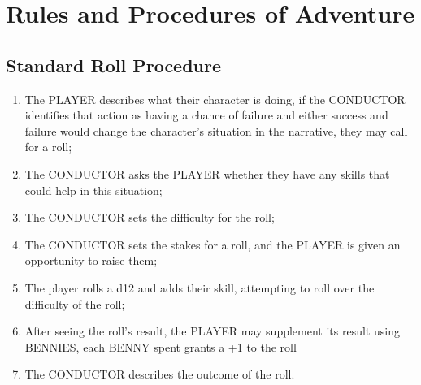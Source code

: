 \section{Rules and Procedures of Adventure}

\subsection{Standard Roll Procedure}
\begin{enumerate}
    \item {The PLAYER describes what their character is doing, if the CONDUCTOR identifies that action as having a chance of failure and either success and failure would change the character's situation in the narrative, they may call for a roll;}
    \item {The CONDUCTOR asks the PLAYER whether they have any skills that could help in this situation;}
    \item {The CONDUCTOR sets the difficulty for the roll;}
    \item {The CONDUCTOR sets the stakes for a roll, and the PLAYER is given an opportunity to raise them;}
    \item {The player rolls a d12 and adds their skill, attempting to roll over the difficulty of the roll;}
    \item {After seeing the roll's result, the PLAYER may supplement its result using BENNIES, each BENNY spent grants a +1 to the roll}
    \item {The CONDUCTOR describes the outcome of the roll.}
\end{enumerate}

